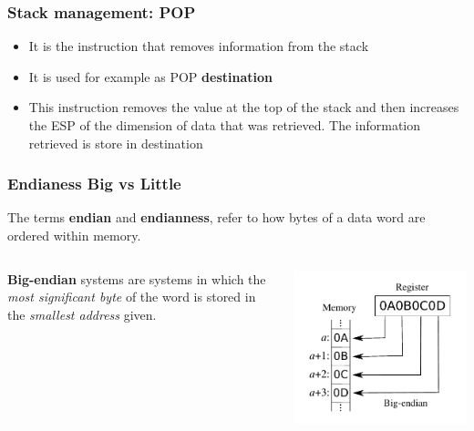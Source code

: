 \documentclass[]{beamer}
\begin{document}
 \begin{frame}
      \frametitle{Stack management: POP}
        \begin{itemize}
            \item{It is the instruction that removes information from the stack}
            \item{It is used for example as  POP {\bf destination} }
            \item{This instruction removes the value at the top of the stack and then increases the ESP of the dimension of data that was retrieved. The information retrieved is store in destination}
        \end{itemize}
      \end{frame}


 \begin{frame}
      \frametitle{Endianess Big vs Little}
      	The terms \textbf{endian} and \textbf{endianness}, refer to how bytes of a data word are ordered within memory.
      	\begin{columns}
      		\begin{column}{0.72\columnwidth}
      		\textbf{Big-endian} systems are systems in which the \emph{most significant byte} of the word is stored in the \emph{smallest address} given.
      		\end{column}
      		\begin{column}{0.28\columnwidth}
                  \includegraphics[width=\textwidth]{images/Big-Endian.pdf}

\end{column}
\end{columns}
\end{frame}
\end{document}
